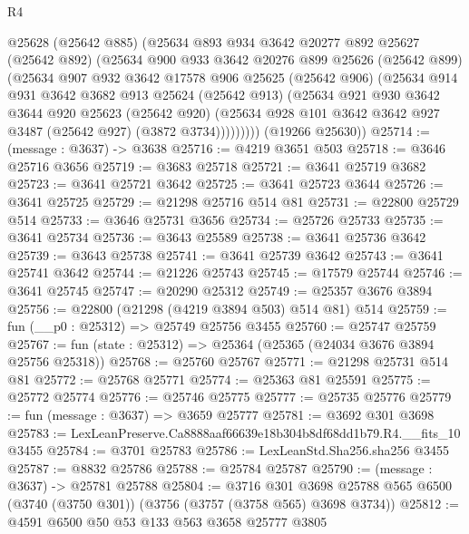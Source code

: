 \begin{lexlean}{R4}
\begin{coremodule}
          @25628
          (@25642 @885)
          (@25634
            @893
            @934
            @3642
            @20277
            @892
            @25627
            (@25642 @892)
            (@25634
              @900
              @933
              @3642
              @20276
              @899
              @25626
              (@25642 @899)
              (@25634
                @907
                @932
                @3642
                @17578
                @906
                @25625
                (@25642 @906)
                (@25634
                  @914
                  @931
                  @3642
                  @3682
                  @913
                  @25624
                  (@25642 @913)
                  (@25634
                    @921
                    @930
                    @3642
                    @3644
                    @920
                    @25623
                    (@25642 @920)
                    (@25634 @928 @101 @3642 @3642 @927 @3487 (@25642 @927) (@3872 @3734)))))))))
      (@19266 @25630))
@25714 := (message : @3637) -> @3638
@25716 := @4219 @3651 @503
@25718 := @3646 @25716 @3656
@25719 := @3683 @25718
@25721 := @3641 @25719 @3682
@25723 := @3641 @25721 @3642
@25725 := @3641 @25723 @3644
@25726 := @3641 @25725
@25729 := @21298 @25716 @514 @81
@25731 := @22800 @25729 @514
@25733 := @3646 @25731 @3656
@25734 := @25726 @25733
@25735 := @3641 @25734
@25736 := @3643 @25589
@25738 := @3641 @25736 @3642
@25739 := @3643 @25738
@25741 := @3641 @25739 @3642
@25743 := @3641 @25741 @3642
@25744 := @21226 @25743
@25745 := @17579 @25744
@25746 := @3641 @25745
@25747 := @20290 @25312
@25749 := @25357 @3676 @3894
@25756 := @22800 (@21298 (@4219 @3894 @503) @514 @81) @514
@25759 := fun (__p0 : @25312) => @25749 @25756 @3455
@25760 := @25747 @25759
@25767 := fun (state : @25312) => @25364 (@25365 (@24034 @3676 @3894 @25756 @25318))
@25768 := @25760 @25767
@25771 := @21298 @25731 @514 @81
@25772 := @25768 @25771
@25774 := @25363 @81 @25591
@25775 := @25772 @25774
@25776 := @25746 @25775
@25777 := @25735 @25776
@25779 := fun (message : @3637) => @3659 @25777
@25781 := @3692 @301 @3698
@25783 := LexLeanPreserve.Ca8888aaf66639e18b304b8df68dd1b79.R4.__fits_10 @3455
@25784 := @3701 @25783
@25786 := LexLeanStd.Sha256.sha256 @3455
@25787 := @8832 @25786
@25788 := @25784 @25787
@25790 := (message : @3637) -> @25781 @25788
@25804 := @3716
    @301
    @3698
    @25788
    @565
    @6500
    (@3740 (@3750 @301))
    (@3756 (@3757 (@3758 @565) @3698 @3734))
@25812 := @4591 @6500 @50 @53 @133 @563 @3658 @25777 @3805

\end{coremodule}
\end{lexlean}
